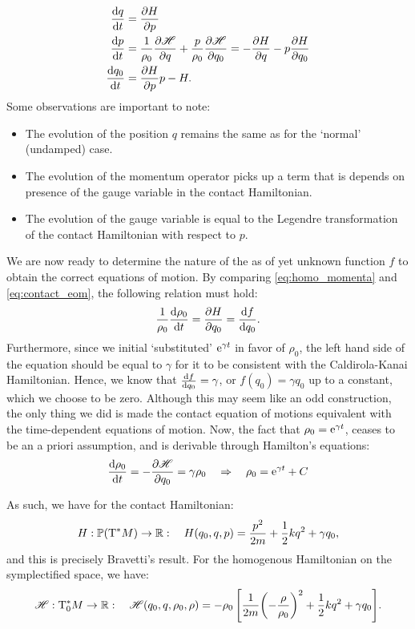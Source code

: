 \begin{equation}
    \begin{split}
        \dv{q}{t} &= \pdv{H}{p} \\
        \dv{p}{t} &= \frac{1}{\rho_0}\pdv{\mathscr{H}}{q} + \frac{p}{\rho_0}\pdv{\mathscr{H}}{q_0} = - \pdv{H}{q} - p\pdv{H}{q_0} \\
        \dv{q_0}{t} &= \pdv{H}{p}p - H.
    \end{split}
    \label{eq:contact_eom}
\end{equation}
Some observations are important to note:
\begin{itemize}
    \item The evolution of the position $q$ remains the same as for the `normal' (undamped) case.
    \item The evolution of the momentum operator picks up a term that is depends on presence of the gauge variable in the contact Hamiltonian.
    \item The evolution of the gauge variable is equal to the Legendre transformation of the contact Hamiltonian with respect to $p$.
\end{itemize}

We are now ready to determine the nature of the as of yet unknown function $f$ to obtain the correct equations of motion. By comparing \cref{eq:homo_momenta} and \cref{eq:contact_eom}, the following relation must hold:
$$ \frac{1}{\rho_0}\dv{\rho_0}{t} = \pdv{H}{q_0} = \dv{f}{q_0}. $$
Furthermore, since we initial `substituted' $\mathrm{e}^{\gamma t}$ in favor of $\rho_0$, the left hand side of the equation should be equal to $\gamma$ for it to be consistent with the Caldirola-Kanai Hamiltonian. Hence, we know that $\dv{f}{q_0} = \gamma$, or $f(q_0) = \gamma q_0$ up to a constant, which we choose to be zero. Although this may seem like an odd construction, the only thing we did is made the contact equation of motions equivalent with the time-dependent equations of motion. Now, the fact that $\rho_0 = \mathrm{e}^{\gamma t}$, ceases to be an a priori assumption, and is derivable through Hamilton's equations:
$$ \dv{\rho_0}{t} = -\pdv{\mathscr{H}}{q_0} = \gamma\rho_0 \quad \Rightarrow \quad \rho_0 = \mathrm{e}^{\gamma t} + C$$

As such, we have for the contact Hamiltonian:
\begin{equation}
    H: \mathbb{P}\qty(\mathrm{T}^*M) \to \mathbb{R}: \quad H(q_0, q, p) = \frac{p^2}{2m} + \frac{1}{2}kq^2 + \gamma q_0,
    \label{eq:H_dho}
\end{equation}
and this is precisely Bravetti's result. For the homogenous Hamiltonian on the symplectified space, we have:
\begin{equation}
    \mathscr{H}: \mathrm{T}^*_0M \to \mathbb{R}: \quad \mathscr{H}(q_0, q, \rho_0, \rho) = -\rho_0\,\qty[\frac{1}{2m}\qty(-\frac{\rho}{\rho_0})^2 + \frac{1}{2}kq^2 + \gamma q_0]. 
    \label{eq:H_dho_homo}
\end{equation}

